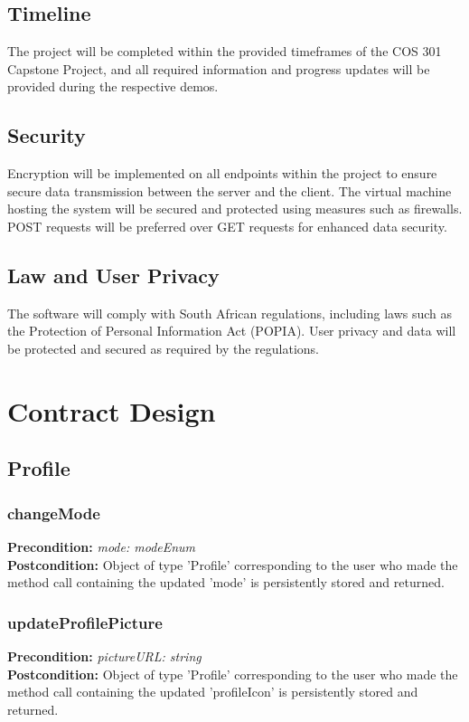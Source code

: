 \documentclass[12pt]{article}
\begin{document}
\subsection{Timeline}
The project will be completed within the provided timeframes of the COS 301 Capstone Project, and all required information and progress updates will be provided during the respective demos.

\subsection{Security}
Encryption will be implemented on all endpoints within the project to ensure secure data transmission between the server and the client. The virtual machine hosting the system will be secured and protected using measures such as firewalls. POST requests will be preferred over GET requests for enhanced data security.

\subsection{Law and User Privacy}
The software will comply with South African regulations, including laws such as the Protection of Personal Information Act (POPIA). User privacy and data will be protected and secured as required by the regulations.


\newpage

\section{Contract Design}

\subsection{Profile}

\subsubsection*{changeMode}
\textbf{Precondition:} \textit{mode: modeEnum} \\
\textbf{Postcondition:} Object of type 'Profile' corresponding to the user who made the method call containing the updated 'mode' is persistently stored and returned.

\subsubsection*{updateProfilePicture}
\textbf{Precondition:} \textit{pictureURL: string} \\
\textbf{Postcondition:} Object of type 'Profile' corresponding to the user who made the method call containing the updated 'profileIcon' is persistently stored and returned.
\end{document}
